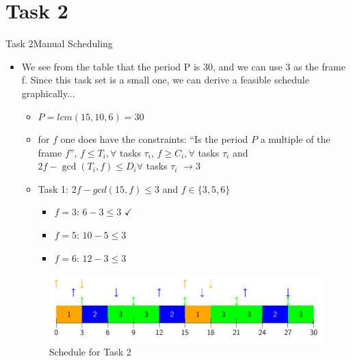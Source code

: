 
\section{Task 2}

\setcounter{task}{1}

\begin{frame}[allowframebreaks]{Task 2}{Manual Scheduling\vspace{0.5cm}}
  \begin{itemize}
    \item We see from the table that the period P is 30, and we can use 3 as the frame f. Since this task set is a small one, we can derive a feasible schedule graphically...
      \begin{itemize}
        \item $P = lcm(15, 10, 6) = 30$
        \item for $f$ one does have the \alert{constraints}: \enquote{Is the period $P$ a multiple of the frame $f$}, $f \leq T_i, \forall$ tasks $\tau_i$, $f \geq C_i, \forall$ tasks $\tau_i$ and $2 f-\operatorname{gcd}\left(T_i, f\right) \leq D_i \forall$ tasks $\tau_i$ $\rightarrow 3$
      \item \alert{Task 1:} $2f-gcd(15, f)\le 3$ and $f\in\{3, 5, 6\}$
      \begin{itemize}
        \item $f=3$: $6-3\le 3$ $\checkmark$
        \item $f=5$: $10-5\le 3$
        \item $f=6$: $12-3\le 3$
      \end{itemize}
  \end{itemize}
  \begin{figure}
    \includegraphics[width=0.7\paperwidth]{./figures/task2_schedule.png}
    \caption{Schedule for Task 2}
  \end{figure}
  \end{itemize}
\end{frame}
